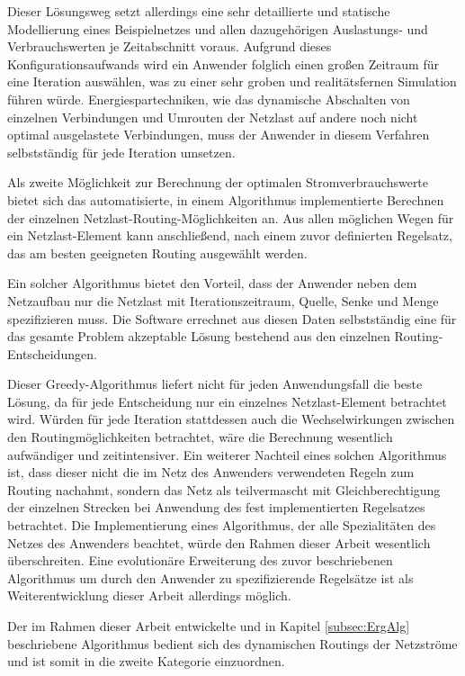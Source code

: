 Dieser Lösungsweg setzt allerdings eine sehr detaillierte und statische Modellierung eines Beispielnetzes und allen dazugehörigen Auslastungs- und Verbrauchswerten je Zeitabschnitt voraus. Aufgrund dieses Konfigurationsaufwands wird ein Anwender folglich einen großen Zeitraum für eine Iteration auswählen, was zu einer sehr groben und realitätsfernen Simulation führen würde. Energiespartechniken, wie das dynamische Abschalten von einzelnen Verbindungen und Umrouten der Netzlast auf andere noch nicht optimal ausgelastete Verbindungen, muss der Anwender in diesem Verfahren selbstständig für jede Iteration umsetzen.

Als zweite Möglichkeit zur Berechnung der optimalen Stromverbrauchswerte bietet sich das automatisierte, in einem Algorithmus implementierte Berechnen der einzelnen Netz\-last-Routing-Mög\-lich\-kei\-ten an. Aus allen möglichen Wegen für ein Netzlast-Element kann anschließend, nach einem zuvor definierten Regelsatz, das am besten geeigneten Routing ausgewählt werden.

Ein solcher Algorithmus bietet den Vorteil, dass der Anwender neben dem Netzaufbau nur die Netzlast mit Iterationszeitraum, Quelle, Senke und Menge spezifizieren muss. Die Software errechnet aus diesen Daten selbstständig eine für das gesamte Problem akzeptable Lösung bestehend aus den einzelnen Routing-Entscheidungen.

Dieser Greedy-Algorithmus liefert nicht für jeden Anwendungsfall die beste Lösung, da für jede Entscheidung nur ein einzelnes Netzlast-Element betrachtet wird.
Würden für jede Iteration stattdessen auch die Wechselwirkungen zwischen den Routingmöglichkeiten betrachtet, wäre die Berechnung wesentlich aufwändiger und zeitintensiver.
Ein weiterer Nachteil eines solchen Algorithmus ist, dass dieser nicht die im Netz des Anwenders verwendeten Regeln zum Routing nachahmt, sondern das Netz als teilvermascht mit Gleichberechtigung der einzelnen Strecken bei Anwendung des fest implementierten Regelsatzes betrachtet.
Die Implementierung eines Algorithmus, der alle Spezialitäten des Netzes des Anwenders beachtet, würde den Rahmen dieser Arbeit wesentlich überschreiten. Eine evolutionäre Erweiterung des zuvor beschriebenen Algorithmus um durch den Anwender zu spezifizierende Regelsätze ist als Weiterentwicklung dieser Arbeit allerdings möglich.

Der im Rahmen dieser Arbeit entwickelte und in Kapitel \ref{subsec:ErgAlg} beschriebene Algorithmus bedient sich des dynamischen Routings der Netzströme und ist somit in die zweite Kategorie einzuordnen.

